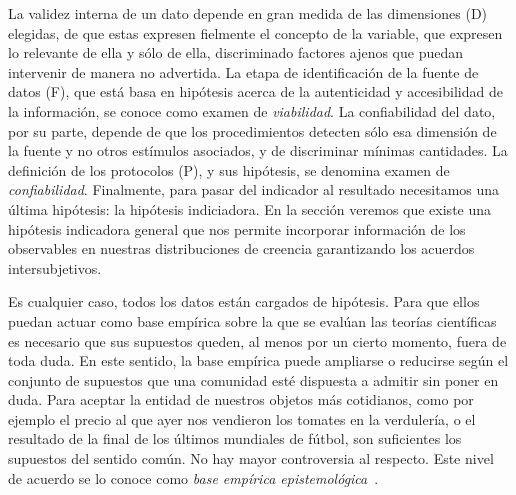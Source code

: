 \documentclass[a4paper,10pt]{book}
\newcommand{\N}{\mathcal{N}}
\theoremstyle{definition}
\newif\ifen
\newif\ifes
\newcommand{\en}[1]{\ifen#1\fi}
\newcommand{\es}[1]{\ifes#1\fi}
\begin{document}
%
\en{The agents exhibit different performances at each event, varying around their true skill, $\N(p\,|\,s,\beta^2)$. }%
\es{Los agentes exhiben distintos desempe\~nos en cada evento, que var\'ian alrededor de su verdadera habilidad, $\N(p\,|\,s,\beta^2)$. }%
%
\en{The model assumes that the agent with the highest performance wins, $r = (p_i > p_j)$. In other words, whoever obtains a difference of performance greater than 0 wins, $r = (p_i - p_j > 0)$. }%
\es{El modelo supone que gana el agente con mayor rendimiento, $r = (p_i > p_j)$. En otras palabras, gana quien obtenga una diferencia de desempe\~no mayor a 0, $r = (p_i - p_j > 0)$. }%
%


La validez interna de un dato depende en gran medida de las dimensiones (D) elegidas, de que estas expresen fielmente el concepto de la variable, que expresen lo relevante de ella y s\'olo de ella, discriminado factores ajenos que puedan intervenir de manera no advertida.
La etapa de identificaci\'on de la fuente de datos (F), que est\'a basa en hip\'otesis acerca de la autenticidad y accesibilidad de la informaci\'on, se conoce como examen de \emph{viabilidad}.
La confiabilidad del dato, por su parte, depende de que los procedimientos detecten s\'olo esa dimensi\'on de la fuente y no otros est\'imulos asociados, y de discriminar m\'inimas cantidades.
La definici\'on de los protocolos (P), y sus hip\'otesis, se denomina examen de \emph{confiabilidad}.
Finalmente, para pasar del indicador al resultado necesitamos una última hip\'otesis: la hip\'otesis indiciadora.
En la secci\'on  veremos que existe una hip\'otesis indicadora general que nos permite incorporar informaci\'on de los observables en nuestras distribuciones de creencia garantizando los acuerdos intersubjetivos.

Es cualquier caso, todos los datos est\'an cargados de hip\'otesis.
Para que ellos puedan actuar como base emp\'irica sobre la que se evalúan las teor\'ias cient\'ificas es necesario que sus supuestos queden, al menos por un cierto momento, fuera de toda duda.
En este sentido, la base emp\'irica puede ampliarse o reducirse según el conjunto de supuestos que una comunidad est\'e dispuesta a admitir sin poner en duda.
Para aceptar la entidad de nuestros objetos m\'as cotidianos, como por ejemplo el precio al que ayer nos vendieron los tomates en la verduler\'ia, o el resultado de la final de los últimos mundiales de fútbol, son suficientes los supuestos del sentido común.
No hay mayor controversia al respecto.
Este nivel de acuerdo se lo conoce como \emph{base emp\'irica epistemol\'ogica}~\cite{klimovsky1994-desventuras}.%
\end{document}
